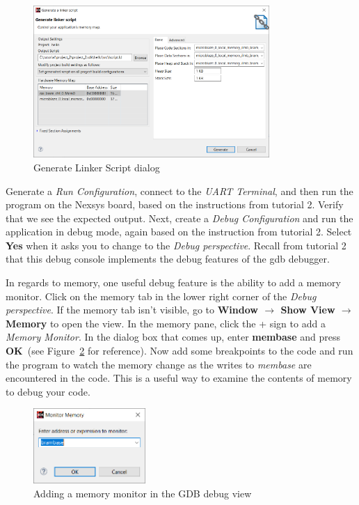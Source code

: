 \documentclass[11pt]{article}
\begin{document}
\begin{figure}[h]
    \centering
    \includegraphics[width=0.8\textwidth]{images/gen_linker_script.png}
    \caption{Generate Linker Script dialog}
    \label{fig:gen_linker_script}
\end{figure}

Generate a \textit{Run Configuration}, connect to the \textit{UART Terminal}, and then run the program on the Nexsys board, based on the instructions from tutorial 2. Verify that we see the expected output. Next, create a \textit{Debug Configuration} and run the application in debug mode, again based on the instruction from tutorial 2. Select \textbf{Yes} when it asks you to change to the \textit{Debug perspective}. Recall from tutorial 2 that this debug console implements the debug features of the gdb debugger. 

In regards to memory, one useful debug feature is the ability to add a memory monitor. Click on the memory tab in the lower right corner of the \textit{Debug perspective}. If the memory tab isn't visible, go to \textbf{Window $\rightarrow$ Show View $\rightarrow$ Memory} to open the view. In the memory pane, click the + sign to add a \textit{Memory Monitor}. In the dialog box that comes up, enter \textbf{membase} and press \textbf{OK}~(see Figure~\ref{fig:add_mem_mon} for reference). Now add some breakpoints to the code and run the program to watch the memory change as the writes to \textit{membase} are encountered in the code. This is a useful way to examine the contents of memory to debug your code.

\begin{figure}[h]
    \centering
    \includegraphics[width=0.38\textwidth]{images/add_mem_mon.png}
    \caption{Adding a memory monitor in the GDB debug view}
    \label{fig:add_mem_mon}
\end{figure}
\end{document}
